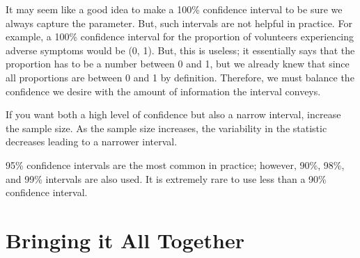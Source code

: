 \documentclass[
  letterpaper,
  DIV=11,
  numbers=noendperiod]{scrreprt}
\theoremstyle{plain}
\theoremstyle{definition}
\theoremstyle{definition}
\theoremstyle{remark}
\begin{document}
It may seem like a good idea to make a 100\% confidence interval to be
sure we always capture the parameter. But, such intervals are not
helpful in practice. For example, a 100\% confidence interval for the
proportion of volunteers experiencing adverse symptoms would be (0, 1).
But, this is useless; it essentially says that the proportion has to be
a number between 0 and 1, but we already knew that since all proportions
are between 0 and 1 by definition. Therefore, we must balance the
confidence we desire with the amount of information the interval
conveys.

\begin{tcolorbox}[enhanced jigsaw, breakable, titlerule=0mm, colframe=quarto-callout-tip-color-frame, bottomtitle=1mm, opacityback=0, rightrule=.15mm, toptitle=1mm, arc=.35mm, bottomrule=.15mm, left=2mm, title=\textcolor{quarto-callout-tip-color}{\faLightbulb}\hspace{0.5em}{Big Idea}, leftrule=.75mm, coltitle=black, toprule=.15mm, colbacktitle=quarto-callout-tip-color!10!white, colback=white, opacitybacktitle=0.6]

If you want both a high level of confidence but also a narrow interval,
increase the sample size. As the sample size increases, the variability
in the statistic decreases leading to a narrower interval.

\end{tcolorbox}

\begin{tcolorbox}[enhanced jigsaw, breakable, titlerule=0mm, colframe=quarto-callout-note-color-frame, bottomtitle=1mm, opacityback=0, rightrule=.15mm, toptitle=1mm, arc=.35mm, bottomrule=.15mm, left=2mm, title=\textcolor{quarto-callout-note-color}{\faInfo}\hspace{0.5em}{Note}, leftrule=.75mm, coltitle=black, toprule=.15mm, colbacktitle=quarto-callout-note-color!10!white, colback=white, opacitybacktitle=0.6]

95\% confidence intervals are the most common in practice; however,
90\%, 98\%, and 99\% intervals are also used. It is extremely rare to
use less than a 90\% confidence interval.

\end{tcolorbox}

\section{Bringing it All Together}\label{bringing-it-all-together}
\end{document}
